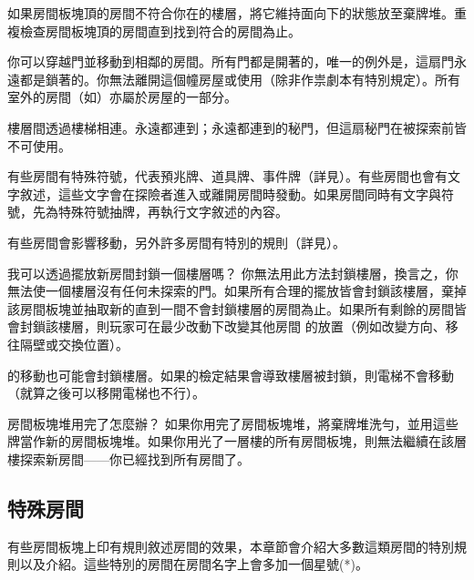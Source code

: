 如果房間板塊頂的房間不符合你在的樓層，將它維持面向下的狀態放至棄牌堆。重複檢查房間板塊頂的房間直到找到符合的房間為止。

你可以穿越門並移動到相鄰的房間。所有門都是開著的，唯一的例外是，這扇門永遠都是鎖著的。你無法離開這個幢房屋或使用（除非作祟劇本有特別規定）。所有室外的房間（如）亦屬於房屋的一部分。

樓層間透過樓梯相連。永遠都連到；永遠都連到的秘門，但這扇秘門在被探索前皆不可使用。

有些房間有特殊符號，代表預兆牌、道具牌、事件牌（詳見）。有些房間也會有文字敘述，這些文字會在探險者進入或離開房間時發動。如果房間同時有文字與符號，先為特殊符號抽牌，再執行文字敘述的內容。

有些房間會影響移動，另外許多房間有特別的規則（詳見）。

\begin{RuleBox}{我可以透過擺放新房間封鎖一個樓層嗎？}
	你無法用此方法封鎖樓層，換言之，你無法使一個樓層沒有任何未探索的門。如果所有合理的擺放皆會封鎖該樓層，棄掉該房間板塊並抽取新的直到一間不會封鎖樓層的房間為止。如果所有剩餘的房間皆會封鎖該樓層，則玩家可在最少改動下改變其他房間 的放置（例如改變方向、移往隔壁或交換位置）。

	的移動也可能會封鎖樓層。如果的檢定結果會導致樓層被封鎖，則電梯不會移動（就算之後可以移開電梯也不行）。
\end{RuleBox}

\begin{RuleBox}{房間板塊堆用完了怎麼辦？}
	如果你用完了房間板塊堆，將棄牌堆洗勻，並用這些牌當作新的房間板塊堆。如果你用光了一層樓的所有房間板塊，則無法繼續在該層樓探索新房間——你已經找到所有房間了。
\end{RuleBox}


\subsection{特殊房間} \label{ssec:special-rooms}

有些房間板塊上印有規則敘述房間的效果，本章節會介紹大多數這類房間的特別規則以及介紹。這些特別的房間在房間名字上會多加一個星號(*)。

